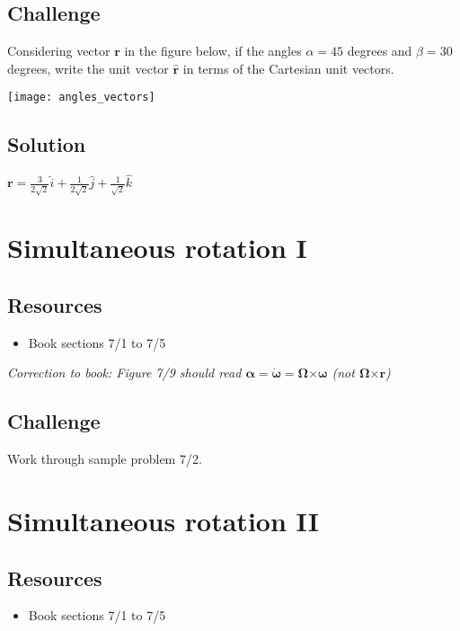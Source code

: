\subsection*{Challenge}
Considering vector $\bm{r}$ in the figure below, if the angles $\alpha = 45$ degrees and $\beta = 30$ degrees, write the unit vector $\bm{\hat{r}}$ in terms of the Cartesian unit vectors.

\texttt{[image: angles\_vectors]}

\subsection*{Solution}
$\bm{r} = \frac{3}{2\sqrt{2}} \hat{i} + \frac{1}{2\sqrt{2}} \hat{j} + \frac{1}{\sqrt{2}} \hat{k}$


\newpage
\section{Simultaneous rotation I}

\subsection*{Resources}
\begin{itemize}
    \item Book sections 7/1 to 7/5
\end{itemize}

\emph{Correction to book: Figure 7/9 should read $\bm{\alpha} = \bm{\dot{\omega}} = \bm{\Omega} \bm{\times} \bm{\omega}$ (not $\bm{\Omega} \bm{\times} \bm{r}$)}

\subsection*{Challenge}
Work through sample problem 7/2.




\newpage
\section{Simultaneous rotation II}

\subsection*{Resources}
\begin{itemize}
    \item Book sections 7/1 to 7/5
\end{itemize}

